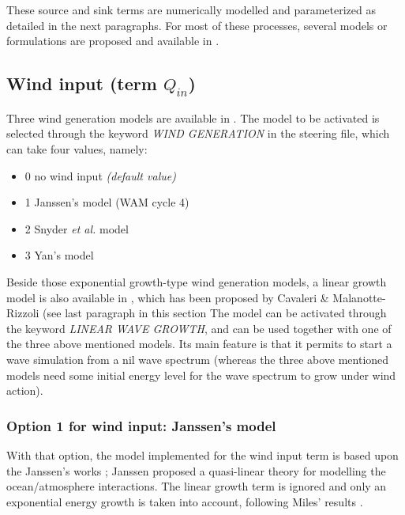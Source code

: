These source and sink terms are numerically modelled and parameterized as
detailed in the next paragraphs. For most of these processes, several models
or formulations are proposed and available in \tomawac.


\subsection{ Wind input (term $Q_{in}$)}
\label{WIND_INPUT}

Three wind generation models are available in \tomawac. The model to be
activated is selected through the keyword \textit{WIND GENERATION} in the
steering file, which can take four values, namely:

\begin{itemize}
\item  0 no wind input \textit{(default value)}
\item  1 Janssen's model \cite{Janssen1989} \cite{Janssen1991} (WAM cycle 4)
\item  2 Snyder \textit{et al. }model \cite{Snyder1981}
\item  3 Yan's model \cite{Yan1987}
\end{itemize}

Beside those exponential growth-type wind generation models, a linear growth
model is also available in \tomawac, which has been proposed by Cavaleri \&
Malanotte-Rizzoli \cite{Cavaleri1981} (see last paragraph in this section
The model can be activated through the keyword \textit{LINEAR WAVE GROWTH},
and can be used together with one of the three above mentioned models. Its
main feature is that it permits to start a wave simulation from a nil wave
spectrum (whereas the three above mentioned models need some initial energy
level for the wave spectrum to grow under wind action).


  \subsubsection{Option 1 for wind input: Janssen's model}
\label{parag4.3.2.1}
With that option, the model implemented for the wind input term is based upon
the Janssen's works \cite{Janssen1989} \cite{Janssen1991}; Janssen proposed a
quasi-linear theory for modelling the ocean/atmosphere interactions. The linear
growth term is ignored and only an exponential energy growth is taken into
account, following Miles' results \cite{Miles1957}.

